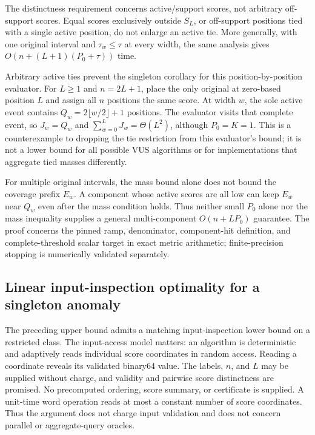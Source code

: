 The distinctness requirement concerns active/support scores, not arbitrary
off-support scores. Equal scores exclusively outside $S_L$, or off-support
positions tied with a single active position, do not enlarge an active tie.
More generally, with one original interval and $\tau_w\le\tau$ at every
width, the same analysis gives $O(n+(L+1)(P_0+\tau))$ time.

Arbitrary active ties prevent the singleton corollary for this
position-by-position evaluator. For $L\ge1$ and $n=2L+1$, place the only original at
zero-based position $L$ and assign all $n$ positions the same score. At
width $w$, the sole active event contains
$Q_w=2\lfloor w/2\rfloor+1$ positions. The evaluator visits that complete
event, so $J_w=Q_w$ and $\sum_{w=0}^L J_w=\Theta(L^2)$, although
$P_0=K=1$. This is a counterexample to dropping the tie restriction from
this evaluator's bound; it is not a lower bound for all possible VUS
algorithms or for implementations that aggregate tied masses differently.

For multiple original intervals, the mass bound alone does not bound the
coverage prefix $E_w$. A component whose active scores are all low can keep
$E_w$ near $Q_w$ even after the mass condition holds. Thus neither small
$P_0$ alone nor the mass inequality supplies a general multi-component
$O(n+LP_0)$ guarantee. The proof concerns the pinned ramp, denominator,
component-hit definition, and complete-threshold scalar target in exact
metric arithmetic; finite-precision stopping is numerically validated
separately.

\subsection{Linear input-inspection optimality for a singleton anomaly}
\label{sec:singleton-optimality}
The preceding upper bound admits a matching input-inspection lower bound
on a restricted class. The input-access model matters: an algorithm is
deterministic and adaptively reads individual score coordinates in random
access. Reading a coordinate reveals its validated binary64 value. The labels,
$n$, and $L$ may be supplied without charge, and validity and pairwise score
distinctness are promised. No precomputed ordering, score summary, or
certificate is supplied. A unit-time word operation reads at most a constant
number of score coordinates. Thus the argument does not charge input
validation and does not concern parallel or aggregate-query oracles.


